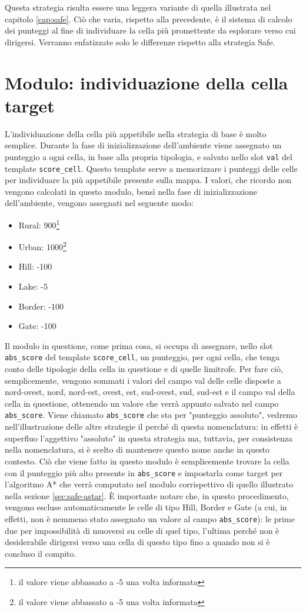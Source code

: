 Questa strategia risulta essere una leggera variante di quella illustrata nel capitolo \ref{cap:safe}. Ciò che varia, rispetto alla precedente, è il sistema di calcolo dei punteggi al fine di individuare la cella più promettente da esplorare verso cui dirigersi. Verranno enfatizzate solo le differenze rispetto alla strategia Safe.

\section{Modulo: individuazione della cella target} \label{sec:base-target}
L'individuazione della cella più appetibile nella strategia di base è molto semplice. Durante la fase di inizializzazione dell'ambiente viene assegnato un punteggio a ogni cella, in base alla propria tipologia, e salvato nello slot \texttt{val} del template \texttt{score\_cell}. Questo template serve a memorizzare i punteggi delle celle per individuare la più appetibile presente sulla mappa. I valori, che ricordo non vengono calcolati in questo modulo, bensì nella fase di inizializzazione dell'ambiente, vengono assegnati nel seguente modo: 
\begin{itemize}
	\item Rural: 900\footnote{il valore viene abbassato a -5 una volta informata}
	\item Urban: 1000\footnote{il valore viene abbassato a -5 una volta informata}
	\item Hill: -100
	\item Lake: -5
	\item Border: -100
	\item Gate: -100
\end{itemize}
Il modulo in questione, come prima cosa, si occupa di assegnare, nello slot \texttt{abs\_score} del template \texttt{score\_cell}, un punteggio, per ogni cella, che tenga conto delle tipologie della cella in questione e di quelle limitrofe. Per fare ciò, semplicemente, vengono sommati i valori del campo val delle celle disposte a nord-ovest, nord, nord-est, ovest, est, sud-ovest, sud, sud-est e il campo val della cella in questione, ottenendo un valore che verrà appunto salvato nel campo \texttt{abs\_score}. Viene chiamato \texttt{abs\_score} che sta per "punteggio assoluto", vedremo nell'illustrazione delle altre strategie il perché di questa nomenclatura: in effetti è superfluo l'aggettivo "assoluto" in questa strategia ma, tuttavia, per consistenza nella nomenclatura, si è scelto di mantenere questo nome anche in questo contesto.
Ciò che viene fatto in questo modulo è semplicemente trovare la cella con il punteggio più alto presente in \texttt{abs\_score} e impostarla come target per l'algoritmo A* che verrà computato nel modulo corrispettivo di quello illustrato nella sezione \ref{sec:safe-astar}. È importante notare che, in questo procedimento, vengono escluse automaticamente le celle di tipo Hill, Border e Gate (a cui, in effetti, non è nemmeno stato assegnato un valore al campo \texttt{abs\_score}): le prime due per impossibilità di muoversi su celle di quel tipo, l'ultima perché non è desiderabile dirigersi verso una cella di questo tipo fino a quando non si è concluso il compito.
